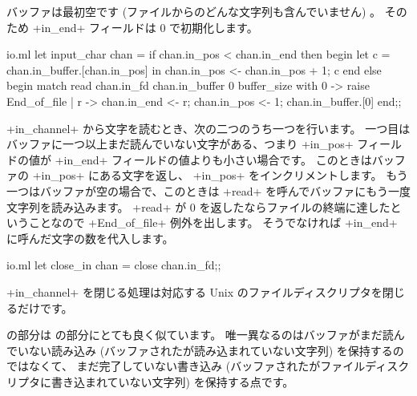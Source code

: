 バッファは最初空です (ファイルからのどんな文字列も含んでいません) 。
そのため \ml+in_end+ フィールドは 0 で初期化します。
%
\begin{listingcodefile}{io.ml}
let input_char chan =
  if chan.in_pos < chan.in_end then begin
    let c =  chan.in_buffer.[chan.in_pos] in
      chan.in_pos <- chan.in_pos + 1;
      c
  end else begin
    match read chan.in_fd chan.in_buffer 0 buffer_size
    with 0 -> raise End_of_file
       | r -> chan.in_end <- r;
              chan.in_pos <- 1;
              chan.in_buffer.[0]
  end;;
\end{listingcodefile}
%
\ml+in_channel+ から文字を読むとき、次の二つのうち一つを行います。
一つ目はバッファに一つ以上まだ読んでいない文字がある、つまり \ml+in_pos+ フィールドの値が
\ml+in_end+ フィールドの値よりも小さい場合です。
このときはバッファの \ml+in_pos+ にある文字を返し、 \ml+in_pos+ をインクリメントします。
もう一つはバッファが空の場合で、このときは \ml+read+ を呼んでバッファにもう一度文字列を読み込みます。
\ml+read+ が 0 を返したならファイルの終端に達したということなので \ml+End_of_file+ 例外を出します。
そうでなければ \ml+in_end+ に呼んだ文字の数を代入します。
%
\begin{listingcodefile}{io.ml}
let close_in chan =
  close chan.in_fd;;
\end{listingcodefile}
%
\ml+in_channel+ を閉じる処理は対応する Unix のファイルディスクリプタを閉じるだけです。

 の部分は  の部分にとても良く似ています。
唯一異なるのはバッファがまだ読んでいない読み込み (バッファされたが読み込まれていない文字列) を保持するのではなくて、
まだ完了していない書き込み (バッファされたがファイルディスクリプタに書き込まれていない文字列)
を保持する点です。

